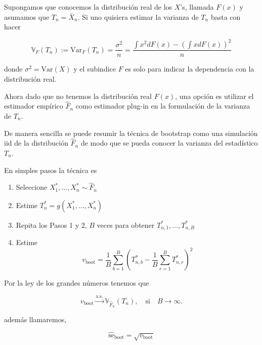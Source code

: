 \documentclass[
  12pt,
]{book}
\providecommand{\tightlist}{%
  \setlength{\itemsep}{0pt}\setlength{\parskip}{0pt}}
\begin{document}
Supongamos que conocemos la distribución real de los \(X\)'s, llamada
\(F(x)\) y asumamos que \(T_n=\bar X_n\). Si uno quisiera estimar la
varianza de \(T_n\) basta con hacer

\begin{equation*}
\mathbb{V}_{F}\left(T_{n}\right):=\mathrm{Var}_{F}\left(T_{n}\right)
= \frac{\sigma^{2}}{n}=\frac{\int x^{2}  dF(x)-\left(\int x
dF(x)\right)^{2}}{n}
\end{equation*}

donde \(\sigma^{2} = \mathrm{Var}\left(X\right)\) y el subindice \(F\)
es solo para indicar la dependencia con la distribución real.

Ahora dado que no tenemos la distribución real \(F(x)\), una opción es
utilizar el estimador empírico \(\hat{F}_n\) como estimador plug-in en
la formulación de la varianza de \(T_n\).

De manera sencilla se puede resumir la técnica de bootstrap como una
simulación iid de la distribución \(\hat{F}_n\) de modo que se pueda
conocer la varianza del estadístico \(T_n\).

En simples pasos la técnica es

\begin{enumerate}
\def\labelenumi{\arabic{enumi}.}
\tightlist
\item
  Seleccione \(X_{1}^{*}, \ldots, X_{n}^{*} \sim \widehat{F}_{n}\)
\item
  Estime \(T_{n}^{*}=g\left(X_{1}^{*}, \ldots, X_{n}^{*}\right)\)
\item
  Repita los Pasos 1 y 2, \(B\) veces para obtener
  \(T_{n, 1}^{*}, \ldots, T_{n, B}^{*}\)
\item
  Estime \[
  v_{\mathrm{boot}}=\frac{1}{B} \sum_{b=1}^{B}\left(T_{n, b}^{*}-\frac{1}{B} \sum_{r=1}^{B} T_{n, r}^{*}\right)^{2}
  \]
\end{enumerate}

Por la ley de los grandes números tenemos que

\begin{equation}
v_{\mathrm{boot}} \stackrel{\mathrm{a.s.}}{\longrightarrow} \mathbb{V}_{\widehat{F}_{n}}\left(T_{n}\right), \quad  \text{si} \quad B\rightarrow \infty.
\end{equation}

además llamaremos,

\begin{equation*}
\widehat{\mathrm{se}}_{\mathrm{boot}}=\sqrt{v_{\mathrm{boot}}}
\end{equation*}
\end{document}
